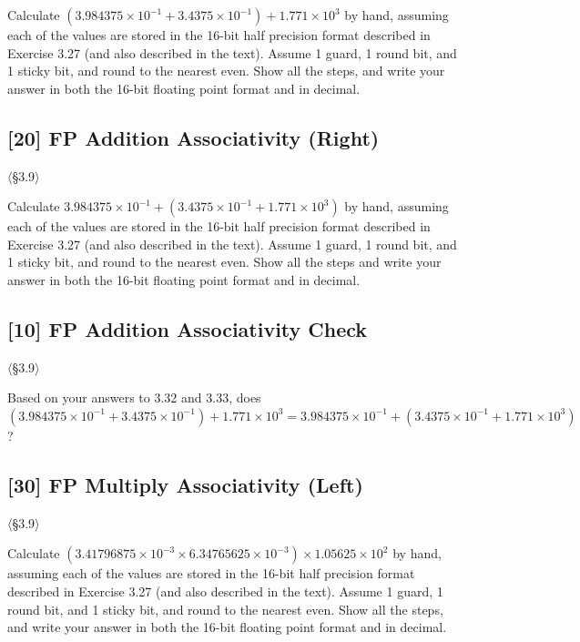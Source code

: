 \noindent Calculate $(3.984375 \times 10^{-1} + 3.4375 \times 10^{-1})
+ 1.771 \times 10^{3}$ by hand, assuming each of the values are stored in the
16-bit half precision format described in Exercise 3.27 (and also described in
the text). Assume 1 guard, 1 round bit, and 1 sticky bit, and round to the
nearest even. Show all the steps, and write your answer in both the 16-bit
floating point format and in decimal.

\problembreak

\subsection{[20] FP Addition Associativity (Right)}
\hypertarget{prob-3.33}{}
\noindent$\langle$\S3.9$\rangle$\medskip

\noindent Calculate $3.984375 \times 10^{-1} + (3.4375 \times 10^{-1}
+ 1.771 \times 10^{3})$ by hand, assuming each of the values are stored in
the 16-bit half precision format described in Exercise 3.27 (and also
described in the text). Assume 1 guard, 1 round bit, and 1 sticky bit, and
round to the nearest even. Show all the steps and write your answer in both
the 16-bit floating point format and in decimal.

\problembreak

\subsection{[10] FP Addition Associativity Check}
\hypertarget{prob-3.34}{}
\noindent$\langle$\S3.9$\rangle$\medskip

\noindent Based on your answers to 3.32 and 3.33, does
$(3.984375 \times 10^{-1} + 3.4375 \times 10^{-1}) + 1.771 \times 10^{3}
= 3.984375 \times 10^{-1} + (3.4375 \times 10^{-1} + 1.771 \times 10^{3})$?

\problembreak

\subsection{[30] FP Multiply Associativity (Left)}
\hypertarget{prob-3.35}{}
\noindent$\langle$\S3.9$\rangle$\medskip

\noindent Calculate $(3.41796875 \times 10^{-3} \times 6.34765625
\times 10^{-3}) \times 1.05625 \times 10^{2}$ by hand, assuming each of the
values are stored in the 16-bit half precision format described in
Exercise 3.27 (and also described in the text). Assume 1 guard, 1 round bit,
and 1 sticky bit, and round to the nearest even. Show all the steps, and
write your answer in both the 16-bit floating point format and in decimal.

